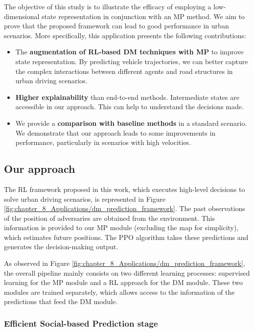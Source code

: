 The objective of this study is to illustrate the efficacy of employing a low-dimensional state representation in conjunction with an MP method. We aim to prove that the proposed framework can lead to good performance in urban scenarios. More specifically, this application presents the following contributions:

\begin{itemize}
	\item The \textbf{augmentation of \ac{RL}-based \ac{DM} techniques with \ac{MP}} to improve state representation. By predicting vehicle trajectories, we can better capture the complex interactions between different agents and road structures in urban driving scenarios. 
	
	\item \textbf{Higher explainability} than end-to-end methods. Intermediate states are accessible in our approach. This can help to understand the decisions made.
	
	\item We provide a \textbf{comparison with baseline methods} in a standard scenario. We demonstrate that our approach leads to some improvements in performance, particularly in scenarios with high velocities.
\end{itemize}

\subsection{Our approach}
\label{subsec:8_decision_making_our_approach}

The \ac{RL} framework proposed in this work, which executes high-level decisions to solve urban driving scenarios, is represented in Figure \ref{fig:chapter_8_Applications/dm_prediction_framework}. The past observations of the position of adversaries are obtained from the environment. This information is provided to our \ac{MP} module (excluding the map for simplicity), which estimates future positions. The \ac{PPO} algorithm takes these predictions and generates the decision-making output.

As observed in Figure \ref{fig:chapter_8_Applications/dm_prediction_framework}, the overall pipeline mainly consists on two different learning processes: supervised learning for the \ac{MP} module and a \ac{RL} approach for the \ac{DM} module. These two modules are trained separately, which allows access to the information of the predictions that feed the \ac{DM} module.

\subsubsection{Efficient Social-based Prediction stage}
\label{subsubsec:8_decision_making_our_approach_prediction}

